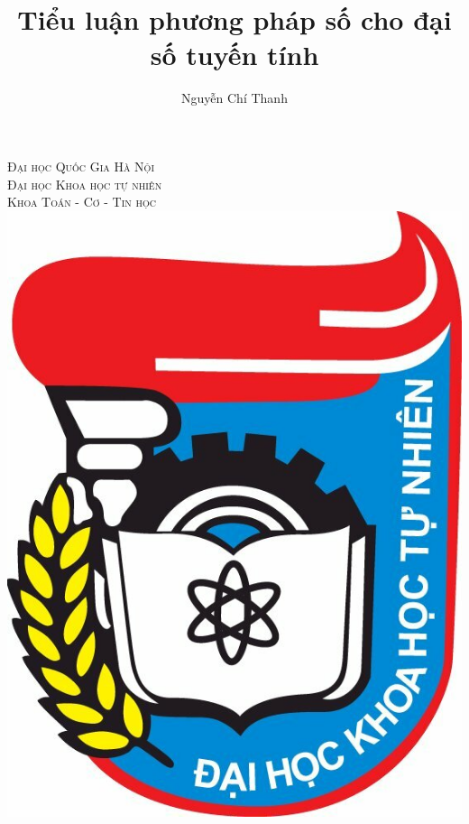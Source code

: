 \documentclass[14pt, a4paper]{article}
\title{Tiểu luận phương pháp số cho đại số tuyến tính}
\author{Nguyễn Chí Thanh}
\numberwithin{equation}{section}
\numberwithin{algorithm}{section}
\numberwithin{figure}{section}
\numberwithin{dl}{section}
\numberwithin{md}{section}
\numberwithin{bd}{section}
\begin{document}
\begin{titlepage}

    \newcommand{\HRule}{\rule{\linewidth}{0.5mm}} %
    
    \center %
     
    \textsc{\LARGE Đại học Quốc Gia Hà Nội}\\[0.5cm]
    \textsc{\LARGE Đại học Khoa học tự nhiên}\\[0.5cm] %
    \textsc{\LARGE Khoa Toán - Cơ - Tin học}\\[0.5cm]

    \includegraphics[scale=0.2]{figures/HUS-logo.jpg}\\[0.5cm]


\end{titlepage}
\end{document}
